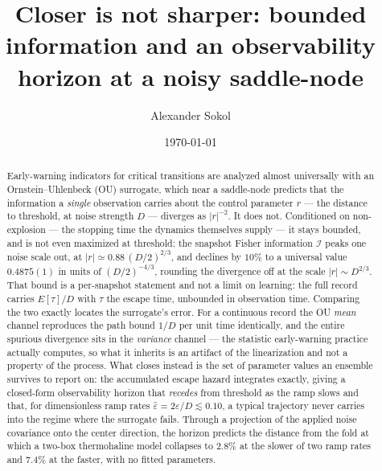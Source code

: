 \documentclass[%
 twocolumn,
 superscriptaddress,
 amsmath,amssymb,
 aps,
 pre,
 floatfix,
]{revtex4-2}
\newcommand{\Ifish}{\mathcal{I}}
\newcommand{\Sig}{\hat\varepsilon}
\begin{document}
\title{Closer is not sharper: bounded information and an
  observability horizon at a noisy saddle-node}

\author{Alexander Sokol}

\date{\today}

\begin{abstract}
Early-warning indicators for critical transitions are analyzed almost universally with an Ornstein--Uhlenbeck (OU) surrogate, which near a saddle-node predicts that the information a \emph{single} observation carries about the control parameter $r$ --- the distance to threshold, at noise strength $D$ --- diverges as $|r|^{-2}$.  It does not.  Conditioned on non-explosion --- the stopping time the dynamics themselves supply --- it stays bounded, and is not even maximized at threshold: the snapshot Fisher information $\Ifish$ peaks one noise scale out, at $|r|\simeq0.88\,(D/2)^{2/3}$, and declines by $10\%$ to a universal value $0.4875(1)$ in units of $(D/2)^{-4/3}$, rounding the divergence off at the scale $|r|\sim D^{2/3}$.  That bound is a per-snapshot statement and not a limit on learning: the full record carries $E[\tau]/D$ with $\tau$ the escape time, unbounded in observation time.  Comparing the two exactly locates the surrogate's error.  For a continuous record the OU \emph{mean} channel reproduces the path bound $1/D$ per unit time identically, and the entire spurious divergence sits in the \emph{variance} channel --- the statistic early-warning practice actually computes, so what it inherits is an artifact of the linearization and not a property of the process.  What closes instead is the set of parameter values an ensemble survives to report on: the accumulated escape hazard integrates exactly, giving a closed-form observability horizon that \emph{recedes} from threshold as the ramp slows and that, for dimensionless ramp rates $\Sig=2\varepsilon/D\lesssim0.10$, a typical trajectory never carries into the regime where the surrogate fails.  Through a projection of the applied noise covariance onto the center direction, the horizon predicts the distance from the fold at which a two-box thermohaline model collapses to $2.8\%$ at the slower of two ramp rates and $7.4\%$ at the faster, with no fitted parameters.
\end{abstract}

\end{document}
